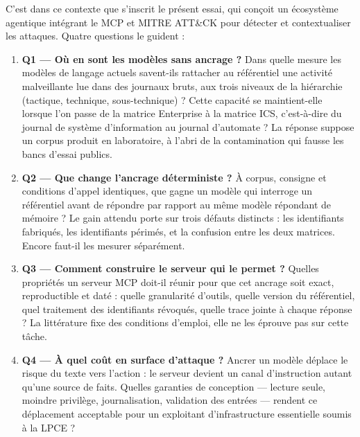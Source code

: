 C'est dans ce contexte que s'inscrit le présent essai, qui conçoit un écosystème agentique intégrant le MCP et MITRE ATT\&CK pour
détecter et contextualiser les attaques. Quatre questions le guident :
\begin{enumerate}\setlength{\itemsep}{0pt}\setlength{\parsep}{0pt}\setlength{\topsep}{2pt}
  \item \textbf{Q1 --- Où en sont les modèles sans ancrage ?} Dans quelle mesure
        les modèles de langage actuels savent-ils rattacher au référentiel une
        activité malveillante lue dans des journaux bruts, aux trois niveaux de
        la hiérarchie (tactique, technique, sous-technique) ? Cette capacité se
        maintient-elle lorsque l'on passe de la matrice Enterprise à la matrice
        ICS, c'est-à-dire du journal de système d'information au journal
        d'automate ? La réponse suppose un corpus produit en laboratoire, à
        l'abri de la contamination qui fausse les bancs d'essai publics.
  \item \textbf{Q2 --- Que change l'ancrage déterministe ?} À corpus, consigne
        et conditions d'appel identiques, que gagne un modèle qui interroge un
        référentiel avant de répondre par rapport au même modèle répondant de
        mémoire ? Le gain attendu porte sur trois défauts distincts : les
        identifiants fabriqués, les identifiants périmés, et la confusion entre
        les deux matrices. Encore faut-il les mesurer séparément.
  \item \textbf{Q3 --- Comment construire le serveur qui le permet ?} Quelles
        propriétés un serveur MCP doit-il réunir pour que cet ancrage soit
        exact, reproductible et daté : quelle granularité d'outils, quelle
        version du référentiel, quel traitement des identifiants révoqués,
        quelle trace jointe à chaque réponse ? La littérature fixe des
        conditions d'emploi, elle ne les éprouve pas sur cette tâche.
  \item \textbf{Q4 --- À quel coût en surface d'attaque ?} Ancrer un modèle
        déplace le risque du texte vers l'action : le serveur devient un canal
        d'instruction autant qu'une source de faits. Quelles garanties de
        conception --- lecture seule, moindre privilège, journalisation,
        validation des entrées --- rendent ce déplacement acceptable pour un
        exploitant d'infrastructure essentielle soumis à la LPCE ?
\end{enumerate}